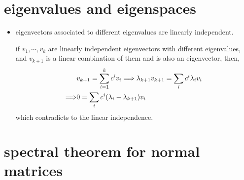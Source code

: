 \section{eigenvalues and eigenspaces} \label{A.1}
\begin{itemize}
	\item eigenvectors associated to different eigenvalues are linearly independent.
	
	\begin{tcolorbox}[title=proof:]
		if $v_1, \cdots, v_k$ are linearly independent eigenvectors with different eigenvalues, and $v_{k + 1}$ is a linear combination of them and is also an eigenvector, then,
		\begin{align}
			&v_{k + 1} = \sum_{i = 1}^k c^i v_i \Longrightarrow \lambda_{k + 1} v_{k + 1} = \sum_i c^i \lambda_i v_i \notag \\
			\Longrightarrow & 0 = \sum_i c^i (\lambda_i - \lambda_{k + 1}) v_i
		\end{align}
		which contradicts to the linear independence.
	\end{tcolorbox}
\end{itemize}

\section{spectral theorem for normal matrices}
